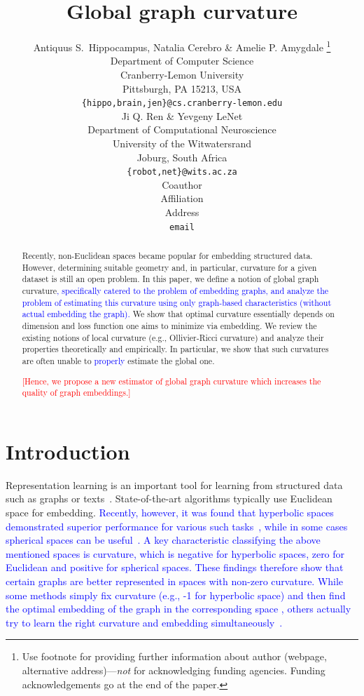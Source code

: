 \documentclass{article} %
\title{Global graph curvature}
\author{Antiquus S.~Hippocampus, Natalia Cerebro \& Amelie P. Amygdale \thanks{ Use footnote for providing further information
about author (webpage, alternative address)---\emph{not} for acknowledging
funding agencies.  Funding acknowledgements go at the end of the paper.} \\
Department of Computer Science\\
Cranberry-Lemon University\\
Pittsburgh, PA 15213, USA \\
\texttt{\{hippo,brain,jen\}@cs.cranberry-lemon.edu} \\
\And
Ji Q. Ren \& Yevgeny LeNet \\
Department of Computational Neuroscience \\
University of the Witwatersrand \\
Joburg, South Africa \\
\texttt{\{robot,net\}@wits.ac.za} \\
\AND
Coauthor \\
Affiliation \\
Address \\
\texttt{email}
}
\newcommand{\ph}[1]{\textcolor{blue}{#1}}
\begin{document}
\maketitle

\begin{abstract}
Recently, non-Euclidean spaces became popular for embedding structured data. However, determining suitable geometry and, in particular, curvature for a given dataset is still an open problem. 
In this paper, we define a notion of global graph curvature\ph{, specifically catered to the problem of embedding graphs, and analyze the problem of estimating this curvature using only graph-based characteristics (without actual embedding the graph).}
We show that optimal curvature essentially depends on dimension and loss function one aims to minimize via embedding.
We review the existing notions of local curvature (e.g., Ollivier-Ricci curvature) and analyze their properties theoretically and empirically. 
In particular, we show that such curvatures are often unable to \ph{properly} estimate the global one. 

\textcolor{red}{[Hence, we propose a new estimator of global graph curvature which increases the quality of graph embeddings.]}
\end{abstract}

\section{Introduction}

Representation learning is an important tool for learning from structured data such as graphs or texts~\citep{grover2016node2vec,perozzi2014deepwalk,mikolov2013distributed}.
State-of-the-art algorithms typically use Euclidean space for embedding. 
\ph{Recently, however, it was found that hyperbolic spaces demonstrated superior performance for various such tasks~\citep{nickel2018learning,sala2018representation}, while in some cases spherical spaces can be useful~\citep{liu2017sphereface}. A key characteristic classifying the above mentioned spaces is curvature, which is negative for hyperbolic spaces, zero for Euclidean and positive for spherical spaces. These findings therefore show that certain graphs are better represented in spaces with non-zero curvature. While some methods simply fix curvature (e.g., -1 for hyperbolic space) and then find the optimal embedding of the graph in the corresponding space \citep{nickel2018learning}, others actually try to learn the right curvature and embedding simultaneously~\cite{gu2019learning}.}
\end{document}
